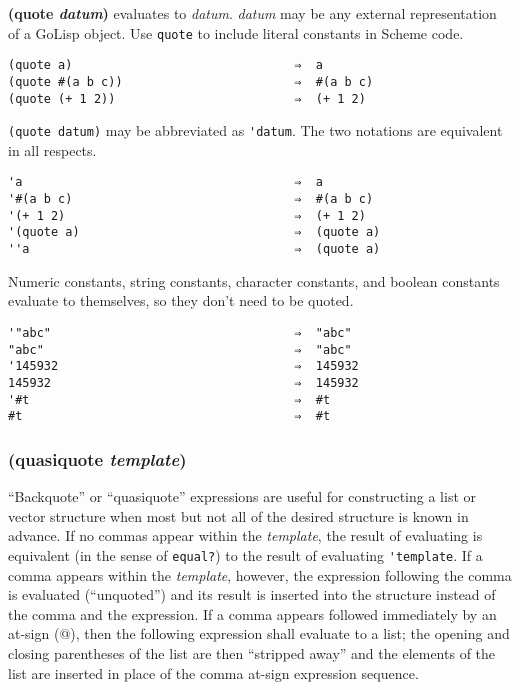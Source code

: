 \documentclass{article}
\begin{document}
\textbf{(quote \emph{datum})} evaluates to \emph{datum}. \emph{datum} may be any external
representation of a GoLisp object. Use \verb|quote| to include literal constants in Scheme
code.

\begin{verbatim}
(quote a)                               ⇒  a
(quote #(a b c))                        ⇒  #(a b c)
(quote (+ 1 2))                         ⇒  (+ 1 2)
\end{verbatim}

\verb|(quote datum)| may be abbreviated as \verb|'datum|. The two notations are equivalent
in all respects.

\begin{verbatim}
'a                                      ⇒  a
'#(a b c)                               ⇒  #(a b c)
'(+ 1 2)                                ⇒  (+ 1 2)
'(quote a)                              ⇒  (quote a)
''a                                     ⇒  (quote a)
\end{verbatim}

Numeric constants, string constants, character constants, and boolean constants evaluate to
themselves, so they don't need to be quoted.

\begin{verbatim}
'"abc"                                  ⇒  "abc"
"abc"                                   ⇒  "abc"
'145932                                 ⇒  145932
145932                                  ⇒  145932
'#t                                     ⇒  #t
#t                                      ⇒  #t
\end{verbatim}

\subsubsection{(quasiquote \emph{template})}

``Backquote'' or ``quasiquote'' expressions are useful for constructing a list or vector
structure when most but not all of the desired structure is known in advance. If no commas
appear within the \emph{template}, the result of evaluating is equivalent (in the sense of
\verb|equal?|) to the result of evaluating \verb|'template|. If a comma appears within the
\emph{template}, however, the expression following the comma is evaluated (``unquoted'') and
its result is inserted into the structure instead of the comma and the expression. If a comma
appears followed immediately by an at-sign (@), then the following expression shall evaluate
to a list; the opening and closing parentheses of the list are then ``stripped away'' and the
elements of the list are inserted in place of the comma at-sign expression sequence.
\end{document}
